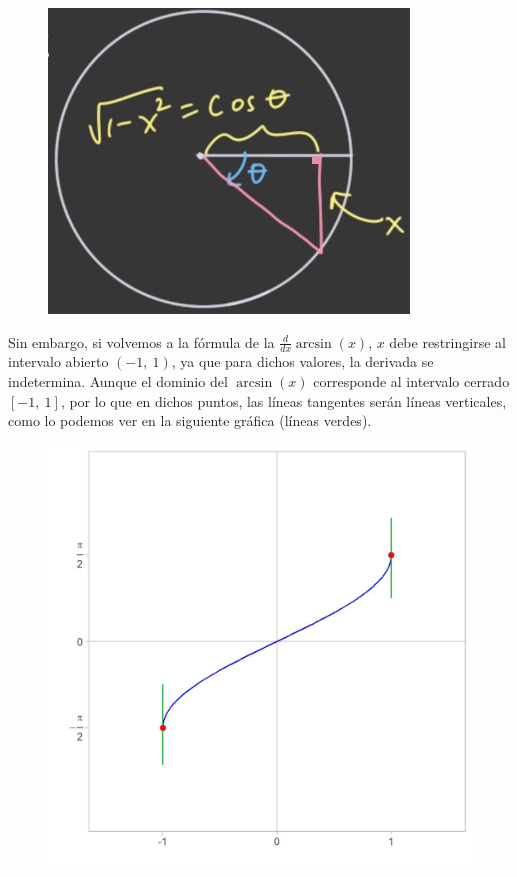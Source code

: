 \documentclass[12pt]{article}
\begin{document}
\begin{figure}[hbt!]
\centering
\includegraphics[scale=0.6]{img/deriv-arcsin-unit-circ.jpg}
\end{figure}

Sin embargo, si volvemos a la fórmula de la $\frac{d}{dx} \arcsin(x)$, $x$ debe restringirse al intervalo abierto $(-1, \ 1)$, ya que para dichos valores, la derivada se indetermina. Aunque el dominio del $\arcsin(x)$ corresponde al intervalo cerrado $[-1, \ 1]$, por lo que en dichos puntos, las líneas tangentes serán líneas verticales, como lo podemos ver en la siguiente gráfica (líneas verdes).

\newpage

\begin{figure}[hbt!]
\centering
\includegraphics[scale=0.6]{img/tan_lines_arcsin.jpg}
\end{figure}
\end{document}
